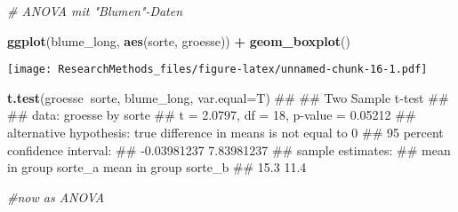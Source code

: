 \documentclass[]{book}
\newenvironment{Shaded}{\begin{snugshade}}{\end{snugshade}}
\newcommand{\KeywordTok}[1]{\textcolor[rgb]{0.13,0.29,0.53}{\textbf{#1}}}
\newcommand{\DataTypeTok}[1]{\textcolor[rgb]{0.13,0.29,0.53}{#1}}
\newcommand{\StringTok}[1]{\textcolor[rgb]{0.31,0.60,0.02}{#1}}
\newcommand{\CommentTok}[1]{\textcolor[rgb]{0.56,0.35,0.01}{\textit{#1}}}
\newcommand{\OperatorTok}[1]{\textcolor[rgb]{0.81,0.36,0.00}{\textbf{#1}}}
\newcommand{\NormalTok}[1]{#1}
\begin{document}
\begin{Shaded}
\begin{Highlighting}[]

\CommentTok{# ANOVA mit "Blumen"-Daten}

\KeywordTok{ggplot}\NormalTok{(blume_long, }\KeywordTok{aes}\NormalTok{(sorte, groesse)) }\OperatorTok{+}
\StringTok{  }\KeywordTok{geom_boxplot}\NormalTok{()}
\end{Highlighting}
\end{Shaded}

\texttt{[image: ResearchMethods\_files/figure-latex/unnamed-chunk-16-1.pdf]}

\begin{Shaded}
\begin{Highlighting}[]

\KeywordTok{t.test}\NormalTok{(groesse}\OperatorTok{~}\NormalTok{sorte, blume_long, }\DataTypeTok{var.equal=}\NormalTok{T)}
\NormalTok{## }
\NormalTok{##  Two Sample t-test}
\NormalTok{## }
\NormalTok{## data:  groesse by sorte}
\NormalTok{## t = 2.0797, df = 18, p-value = 0.05212}
\NormalTok{## alternative hypothesis: true difference in means is not equal to 0}
\NormalTok{## 95 percent confidence interval:}
\NormalTok{##  -0.03981237  7.83981237}
\NormalTok{## sample estimates:}
\NormalTok{## mean in group sorte_a mean in group sorte_b }
\NormalTok{##                  15.3                  11.4}

\CommentTok{#now as ANOVA}


\end{Highlighting}
\end{Shaded}
\end{document}
